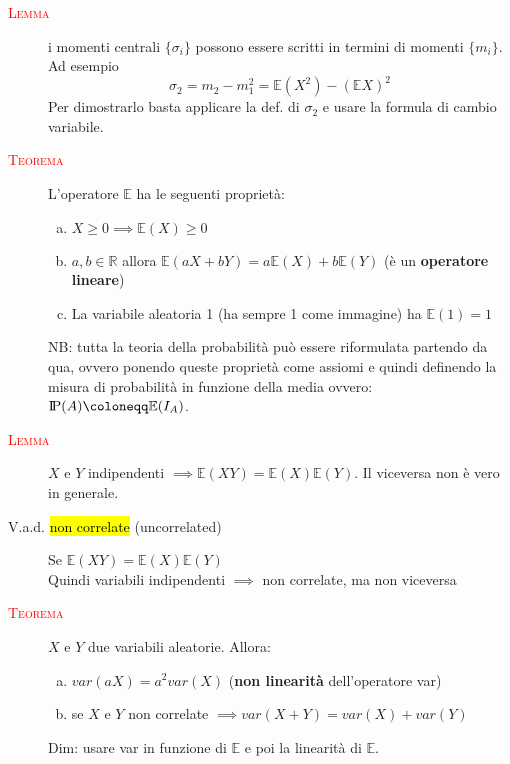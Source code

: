 \documentclass[a4paper,10pt]{article}
\newcommand{\myth}{\normalfont \scshape \textcolor{red}} %
\newcommand{\pr}{\text{I\kern-0.15em P}} %
\theoremstyle{remark}
\theoremstyle{definition}
\begin{document}
\begin{description}
\item[\myth{Lemma}] i momenti centrali $\{\sigma_i\}$ possono essere scritti in termini di momenti $\{m_i\}$.  Ad esempio $$\sigma_2=m_2-m_1^2=\mathbb{E}(X^2)-(\mathbb{E}X)^2$$ Per dimostrarlo basta applicare la def. di $\sigma_2$ e usare la formula di cambio variabile.

\item[\myth{Teorema}] L'operatore $\mathbb{E}$ ha le seguenti proprietà:
\begin{enumerate}[(a)]
    \item $X\ge0 \implies \mathbb{E}(X)\ge0$
    \item $a,b\in\mathbb{R}$ allora $\mathbb{E}(aX+bY)=a\mathbb{E}(X)+b\mathbb{E}(Y)$ (è un \textbf{operatore lineare})
    \item La variabile aleatoria 1 (ha sempre 1 come immagine) ha $\mathbb{E}(1)=1$
\end{enumerate}
NB: tutta la teoria della probabilità può essere riformulata partendo da qua, ovvero ponendo queste proprietà come assiomi e quindi definendo la misura di probabilità in funzione della media ovvero: $\pr(A)\coloneqq\mathbb{E}(I_A)$.
\item[\myth{Lemma}] $X$ e $Y$ indipendenti $\implies \mathbb{E}(XY)=\mathbb{E}(X)\mathbb{E}(Y)$. Il viceversa non è vero in generale.

\item[V.a.d. \hl{non correlate} (uncorrelated)] Se  $\mathbb{E}(XY)=\mathbb{E}(X)\mathbb{E}(Y)$ \\
Quindi variabili indipendenti $\implies$ non correlate, ma non viceversa

\item[\myth{Teorema}] $X$ e $Y$ due variabili aleatorie. Allora:
\begin{enumerate}[(a)]
    \item $var(aX)=a^2var(X)$ (\textbf{non linearità} dell'operatore var)
    \item se $X$ e $Y$ non correlate $\implies var(X+Y)=var(X)+var(Y)$
\end{enumerate}
Dim: usare var in funzione di $\mathbb{E}$ e poi la linearità di $\mathbb{E}$.

\end{description}
\end{document}
